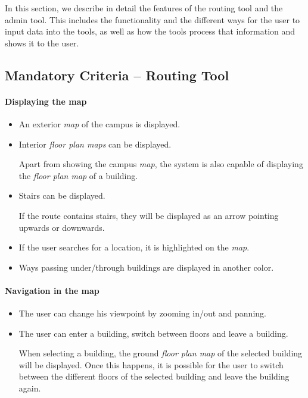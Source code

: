 
In this section, we describe in detail the features of the routing tool and the admin tool. This includes the functionality and the different ways for the user to input data into the tools, as well as how the
tools process that information and shows it to the user.

\subsection{Mandatory Criteria -- Routing Tool} %

\paragraph{Displaying the map}
\begin{itemize}
	\item An exterior \textit{map} of the campus is displayed. %
	\item Interior \textit{floor plan maps} can be displayed.
		\begin{addmargin}[7mm]{0mm}
		Apart from showing the campus \textit{map}, the system is also capable of displaying the \textit{floor plan map} of a building. %
		\end{addmargin}

	\item Stairs can be displayed.
		\begin{addmargin}[7mm]{0mm}
		If the route contains stairs, they will be displayed as an arrow pointing upwards or downwards.
		\end{addmargin}

	\item If the user searches for a location, it is highlighted on the \textit{map}.
	\item Ways passing under/through buildings are displayed in another color.
\end{itemize}

\paragraph{Navigation in the map}
\begin{itemize}
	\item The user can change his viewpoint by zooming in/out and panning.
	\item The user can enter a building, switch between floors and leave a building.
		\begin{addmargin}[7mm]{0mm}
			When selecting a building, the ground \textit{floor plan map} of the selected building will be displayed. Once this happens, it is possible for the user to switch between the different floors of the selected building and leave the building again.
		\end{addmargin}
\end{itemize}

